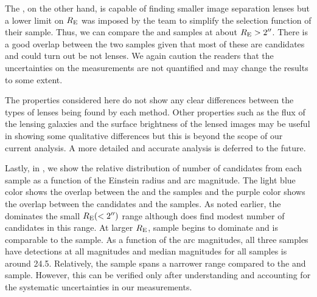 \documentclass[useAMS,usenatbib,a4paper]{mn2e}
\begin{document}
The \af, on the other hand, is capable of finding smaller image
separation lenses but a lower limit on $R_{\rm E}$ was imposed by the
\af team to simplify the selection function of their sample. Thus, we
can compare the \sw and \af samples at about $R_{\rm E}>2\hbox{$^{\prime\prime}$}$. There
is a good overlap between the two samples given that most of these are
candidates and could turn out be not lenses. We again caution the
readers that the uncertainties on the measurements are not quantified
and may change the results to some extent.

The properties considered here do not show any clear differences between
the types of lenses being found by each method. Other properties such as
the flux of the lensing galaxies and the surface brightness of the
lensed images may be useful in showing some qualitative differences but
this is beyond the scope of our current analysis. A more detailed and
accurate analysis is deferred to the future.

Lastly, in , we show the relative distribution of
number of candidates from each sample as a function of the Einstein
radius and arc magnitude. The light blue color shows the overlap between
the \sw and the \rf samples and the purple color shows the overlap
between the \sw candidates and the \af samples. As noted earlier, the
\rf dominates the small $R_{\rm E} (<2\hbox{$^{\prime\prime}$})$ range although \sw does
find modest number of candidates in this range. At larger $R_{\rm E}$,
\sw sample begins to dominate and is comparable to the \af sample.  As a
function of the arc magnitudes, all three samples have detections at all
magnitudes and median magnitudes for all samples is around 24.5.
Relatively, the \rf sample spans a narrower range compared to the \sw
and \af sample. However, this can be verified only after understanding
and accounting for the systematic uncertainties in our measurements.
\end{document}
